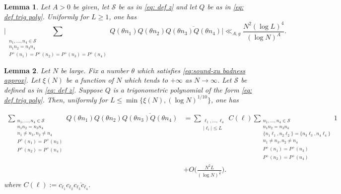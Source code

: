 \documentclass[10pt,a4paper]{amsart}
\newtheorem{lem}{Lemma}
\newcommand{\CS}{\mathcal{S}}
\renewcommand{\geq}{\geqslant}
\renewcommand{\l}{\ell}
\renewcommand{\leq}{\leqslant}
\begin{document}
	\begin{lem}\label{lem: verif cond 3}
		Let $A > 0$ be given, let $\CS$ be as in \eqref{eq: def z} and let $Q$ be as in \eqref{eq: def trig poly}. Uniformly for $L \geq 1$, one has
		$$\bigg|\sum_{\substack{n_1,\dots,n_4 \in \CS \\ n_1n_2=n_3n_4 \\ P^+(n_1)=P^+(n_2) = P^+(n_3) = P^+(n_4)}}Q(\theta n_1)Q(\theta n_2)\overline{Q(\theta n_3)Q(\theta n_4)}\bigg| \ll_{A,g} \frac{N^2 (\log L)^4}{(\log N)^A}.$$
	\end{lem}

	\begin{lem}\label{lem:reduction cond 2} Let $N$ be large. Fix a number $\theta$ which satisfies \eqref{eq:sound-xu badness approx}. Let $\xi(N)$ be a function of $N$ which tends to $+\infty$ as $N \to \infty$. Let $\CS$ be defined as in \eqref{eq: def z}. Suppose $Q$ is a trigonometric polynomial of the form \eqref{eq: def trig poly}. Then, uniformly for $L \leq \min\{\xi(N),(\log N)^{1/10}\}$, one has
		
		\begin{align*}
			\sum_{\substack{n_1,\dots,n_4 \in \CS \\ n_1n_2=n_3n_4 \\ n_1 \ne n_3,n_2 \ne n_4 \\ P^+(n_1)=P^+(n_3) \\ P^+(n_2) = P^+(n_4)}}Q(\theta n_1)Q(\theta n_2)\overline{Q(\theta n_3)Q(\theta n_4)} &= \sum_{\substack{\l_1,\dots,\l_4 \\ |\l_i| \leq L}}C(\bm{\l}) \sum_{\substack{n_1,\dots,n_4 \in \CS \\ n_1n_2=n_3n_4 \\ \{n_1\l_1,n_2\l_2\}=\{n_3\l_3,n_4\l_4\} \\ n_1 \ne n_3,n_2 \ne n_4 \\ P^+(n_1)=P^+(n_3) \\ P^+(n_2) = P^+(n_4) }} 1\\& +O\bigg(\frac{N^2L}{(\log N)^{ \frac{4}{5}}}\bigg).
		\end{align*}
		where $C(\bm{\l}) := c_{\l_1}c_{\l_2}\overline{c_{\l_3}c_{\l_4}}$. 
	\end{lem}
\end{document}
